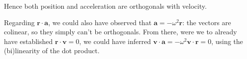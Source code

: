 \documentclass[solutions.tex]{subfiles}
\begin{document}
Hence both position and acceleration are orthogonals with velocity.

\begin{remark} Regarding $\bm{r}\cdot\bm{a}$, we could also have
observed that $\bm{a} = -\omega^2\bm{r}$: the vectors are colinear,
so they simply can't be orthogonals. From there, were we to
already have established $\bm{r}\cdot\bm{v}=0$, we could have
inferred $\bm{v}\cdot\bm{a}=-\omega^2\bm{v}\cdot\bm{r}=0$, using
the (bi)linearity of the dot product.
\end{remark}
\end{document}
